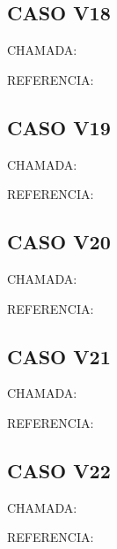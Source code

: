 \documentclass{undftex}
\begin{document}
\begin{refsection}\section*{CASO V18}\noindent CHAMADA:  \par\noindent REFERENCIA:\par\printbibliography[heading=none,check=undfconsultadas]\end{refsection}\clearpage
\begin{refsection}\section*{CASO V19}\noindent CHAMADA:  \par\noindent REFERENCIA:\par\printbibliography[heading=none,check=undfconsultadas]\end{refsection}\clearpage
\begin{refsection}\section*{CASO V20}\noindent CHAMADA:  \par\noindent REFERENCIA:\par\printbibliography[heading=none,check=undfconsultadas]\end{refsection}\clearpage
\begin{refsection}\section*{CASO V21}\noindent CHAMADA:  \par\noindent REFERENCIA:\par\printbibliography[heading=none,check=undfconsultadas]\end{refsection}\clearpage
\begin{refsection}\section*{CASO V22}\noindent CHAMADA:  \par\noindent REFERENCIA:\par\printbibliography[heading=none,check=undfconsultadas]\end{refsection}\clearpage
\end{document}
